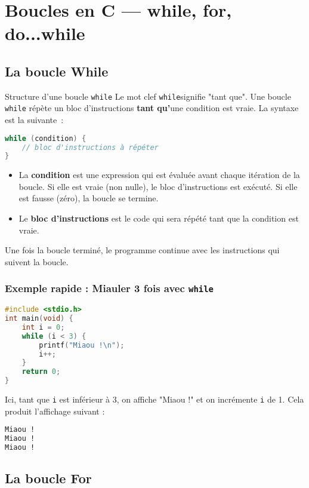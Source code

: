 
\section{Boucles en C — while, for, do...while}

\subsection{La boucle While}
\begin{UPSTIinfor}{Structure d'une boucle \texttt{while}}
	Le mot clef \texttt{while}signifie "tant que". Une boucle \texttt{while} répète un bloc d'instructions \textbf{tant qu'}une condition est vraie.
	La syntaxe est la suivante :
	\begin{lstlisting}[language=c]
while (condition) {
    // bloc d'instructions à répéter
}
\end{lstlisting}
	\begin{itemize}
		\item La \textbf{condition} est une expression qui est évaluée avant chaque itération de la boucle. Si elle est vraie (non nulle), le bloc d'instructions est exécuté. Si elle est fausse (zéro), la boucle se termine.
		\item Le \textbf{bloc d'instructions} est le code qui sera répété tant que la condition est vraie.
	\end{itemize}
	Une fois la boucle terminé, le programme continue avec les instructions qui suivent la boucle.
\end{UPSTIinfor}

\subsubsection{Exemple rapide : Miauler 3 fois avec \texttt{while}}

\begin{lstlisting}[language=c]
#include <stdio.h>
int main(void) {
    int i = 0;
    while (i < 3) {
        printf("Miaou !\n");
        i++;
    }
    return 0;
}
\end{lstlisting}
Ici, tant que \texttt{i} est inférieur à 3, on affiche "Miaou !" et on incrémente \texttt{i} de 1.
Cela produit l'affichage suivant :
\begin{lstlisting}[language=bash,style=console]
Miaou !
Miaou !
Miaou ! 
\end{lstlisting}

\subsection{La boucle For}

